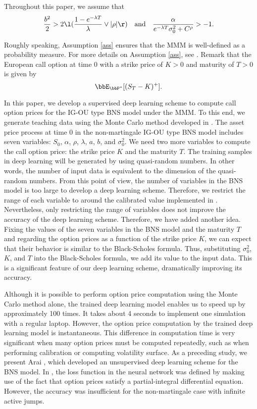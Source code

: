 \begin{ass}\label{ass}
Throughout this paper, we assume that
\[
\frac{b^2}{2}>2\l(\frac{1-e^{-\lambda T}}{\lambda}\vee|\rho|\r) \ \ \ \mbox{and} \ \ \ \frac{\alpha}{e^{-\lambda T}\sigma^2_0+C^\rho}>-1.
\]
\end{ass}

\noindent
Roughly speaking, Assumption \ref{ass} ensures that the MMM is well-defined as a probability measure.
For more details on Assumption \ref{ass}, see \cite{AI}.
Remark that the European call option at time 0 with a strike price of $K>0$ and maturity of $T>0$ is given by
\[
\bbE_{\bbP^*}[(S_T-K)^+].
\]

In this paper, we develop a supervised deep learning scheme to compute call option prices for the IG-OU type BNS model under the MMM.
To this end, we generate teaching data using the Monte Carlo method developed in \cite{AI}.
The asset price process at time 0 in the non-martingale IG-OU type BNS model includes seven variables:
$S_0$, $\alpha$, $\rho$, $\lambda$, $a$, $b$, and $\sigma_0^2$.
We need two more variables to compute the call option price: the strike price $K$ and the maturity $T$.
The training samples in deep learning will be generated by using quasi-random numbers.
In other words, the number of input data is equivalent to the dimension of the quasi-random numbers.
From this point of view, the number of variables in the BNS model is too large to develop a deep learning scheme.
Therefore, we restrict the range of each variable to around the calibrated value implemented in \cite{NV}.
Nevertheless, only restricting the range of variables does not improve the accuracy of the deep learning scheme. Therefore, we have added another idea.
Fixing the values of the seven variables in the BNS model and the maturity $T$ and regarding the option prices as a function of the strike price $K$,
we can expect that their behavior is similar to the Black-Scholes formula.
Thus, substituting $\sigma^2_0$, $K$, and $T$ into the Black-Scholes formula, we add its value to the input data.
This is a significant feature of our deep learning scheme, dramatically improving its accuracy.

Although it is possible to perform option price computation using the Monte Carlo method alone,
the trained deep learning model enables us to speed up by approximately 100 times.
It takes about 4 seconds to implement one simulation with a regular laptop.
However, the option price computation by the trained deep learning model is instantaneous.
This difference in computation time is very significant when many option prices must be computed repeatedly,
such as when performing calibration or computing volatility surface.
As a preceding study, we present Arai \cite{A}, which developed an unsupervised deep learning scheme for the BNS model.
In \cite{A}, the loss function in the neural network was defined by making use of the fact that option prices satisfy
a partial-integral differential equation.
However, the accuracy was insufficient for the non-martingale case with infinite active jumps.

